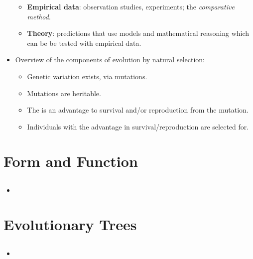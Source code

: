 \documentclass[12pt,a4paper]{article}
\begin{document}
\begin{itemize}
\begin{itemize}
            \item \textbf{Empirical data}: {\color{o-Sun}observation} studies, experiments; the \textit{comparative method}.
            \item \textbf{Theory}: {\color{o-Sun}predictions} that use models and mathematical reasoning which can be be {\color{o-Sun}tested} with empirical data.
        \end{itemize}
    \item Overview of the components of evolution by natural selection:
        \begin{itemize}
            \item Genetic variation exists, via mutations.
            \item Mutations are heritable.
            \item The is an advantage to survival and/or reproduction from the mutation.
            \item Individuals with the advantage in survival/reproduction are selected for.
        \end{itemize}
\end{itemize}

\clearpage
\setcounter{section}{9}
\section{Form and Function}
\subsection{}
\begin{itemize}
    \item 
\end{itemize}

\clearpage
\setcounter{section}{3}
\section{Evolutionary Trees}
\subsection{}
\begin{itemize}
    \item 
\end{itemize}
\end{document}
